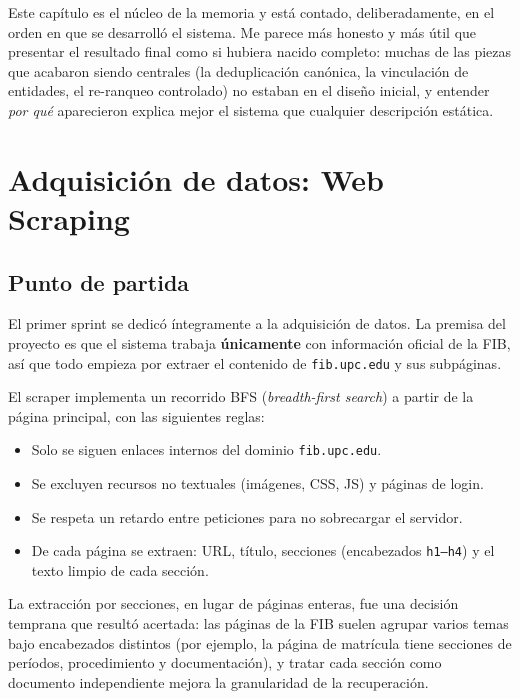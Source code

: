 \documentclass[12pt, a4paper, twoside]{report}
\begin{document}
Este cap\'itulo es el n\'ucleo de la memoria y est\'a contado, deliberadamente, en el orden en que se desarroll\'o el sistema. Me parece m\'as honesto y m\'as \'util que presentar el resultado final como si hubiera nacido completo: muchas de las piezas que acabaron siendo centrales (la deduplicaci\'on can\'onica, la vinculaci\'on de entidades, el re-ranqueo controlado) no estaban en el dise\~no inicial, y entender \textit{por qu\'e} aparecieron explica mejor el sistema que cualquier descripci\'on est\'atica.

\section{Adquisici\'on de datos: Web Scraping}

\subsection{Punto de partida}

El primer sprint se dedic\'o \'integramente a la adquisici\'on de datos. La premisa del proyecto es que el sistema trabaja \textbf{\'unicamente} con informaci\'on oficial de la FIB, as\'i que todo empieza por extraer el contenido de \texttt{fib.upc.edu} y sus subp\'aginas.

El scraper implementa un recorrido BFS (\textit{breadth-first search}) a partir de la p\'agina principal, con las siguientes reglas:

\begin{itemize}
  \item Solo se siguen enlaces internos del dominio \texttt{fib.upc.edu}.
  \item Se excluyen recursos no textuales (im\'agenes, CSS, JS) y p\'aginas de login.
  \item Se respeta un retardo entre peticiones para no sobrecargar el servidor.
  \item De cada p\'agina se extraen: URL, t\'itulo, secciones (encabezados \texttt{h1--h4}) y el texto limpio de cada secci\'on.
\end{itemize}

La extracci\'on por secciones, en lugar de p\'aginas enteras, fue una decisi\'on temprana que result\'o acertada: las p\'aginas de la FIB suelen agrupar varios temas bajo encabezados distintos (por ejemplo, la p\'agina de matr\'icula tiene secciones de per\'iodos, procedimiento y documentaci\'on), y tratar cada secci\'on como documento independiente mejora la granularidad de la recuperaci\'on.
\end{document}
